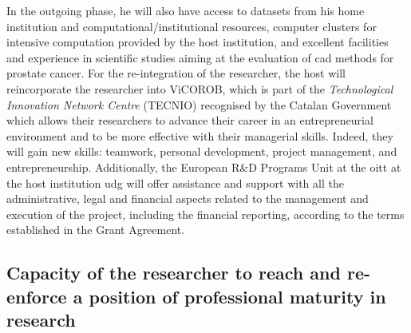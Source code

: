 In the outgoing phase, he will also have access to datasets from his home institution and computational/institutional resources, computer clusters for intensive computation provided by the host institution, and excellent facilities and experience in scientific studies aiming at the evaluation of \ac{cad} methods for prostate cancer. 
For the re-integration of the researcher, the host will reincorporate the researcher into ViCOROB, which is part of the \emph{Technological Innovation Network Centre} (TECNIO) recognised by the Catalan Government which allows their researchers to advance their career in an entrepreneurial environment and to be more effective with their managerial skills.
Indeed, they will gain new skills: teamwork, personal development, project management, and entrepreneurship.
Additionally, the European R\&D Programs Unit at the \ac{oitt} at the host institution \ac{udg} will offer assistance and support with all the administrative, legal and financial aspects related to the management and execution of the project, including the financial reporting, according to the terms established in the Grant Agreement.


\subsection{Capacity of the researcher to reach and re-enforce a position of professional maturity in research}
\label{sec:maturity}

